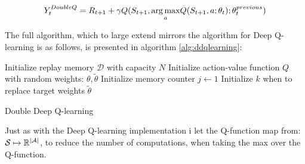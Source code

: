 \begin{equation}\label{eq:ddqn_target_final}
    Y_t^{DoubleQ} = R_{t+1} + \gamma Q(S_{t+1}, \underset{a}{\operatorname*{arg\,max}}Q(S_{t+1}, a; \theta_t); \theta_t^{previous}) 
\end{equation}

The full algorithm, which to large extend mirrors the algorithm for Deep Q-learning is as follows, is presented in algorithm \ref{alg:ddqlearning}:

\begin{algorithm}[H]
\SetAlgoLined
 Initialize replay memory $\mathcal{D}$ with capacity $N$\;
 Initialize action-value function $Q$ with random weights: $\theta, \tilde{\theta}$\;
 Initialize memory counter $j \leftarrow 1$\;
 Initialize $k$ when to replace target weights $\tilde{\theta}$\;
\caption{Double Deep Q-learning}
\label{alg:ddqlearning}
\end{algorithm}

Just as with the Deep Q-learning implementation i let the Q-function map from: $\mathcal{S} \mapsto \mathbb{R}^{\mid \mathcal{A} \mid}$, to reduce the number of computations, when taking the max over the Q-function. 


